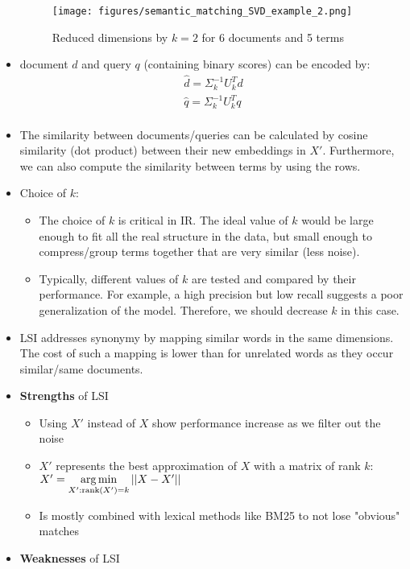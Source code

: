 \begin{itemize}
	\begin{figure}[ht]
		\centering
		\texttt{[image: figures/semantic\_matching\_SVD\_example\_2.png]}
		\caption{Reduced dimensions by $k=2$ for 6 documents and 5 terms}
		\label{img:semantic_matching_SVD_example_2}
	\end{figure}
	\item document $d$ and query $q$ (containing binary scores) can be encoded by:
	\begin{align*}
		\hat{d} = \Sigma_k^{-1} U_k^T d \\
		\hat{q} = \Sigma_k^{-1} U_k^T q \\
	\end{align*}
	\item The similarity between documents/queries can be calculated by cosine similarity (dot product) between their new embeddings in $X'$. Furthermore, we can also compute the similarity between terms by using the rows.
	\item Choice of $k$:
	\begin{itemize}
		\item The choice of $k$ is critical in IR. The ideal value of $k$ would be large enough to fit all the real structure in the data, but small enough to compress/group terms together that are very similar (less noise).
		\item Typically, different values of $k$ are tested and compared by their performance. For example, a high precision but low recall suggests a poor generalization of the model. Therefore, we should decrease $k$ in this case.
	\end{itemize}
	\item LSI addresses synonymy by mapping similar words in the same dimensions. The cost of such a mapping is lower than for unrelated words as they occur similar/same documents. 
	\item \textbf{Strengths} of LSI
	\begin{itemize}
		\item Using $X'$ instead of $X$ show performance increase as we filter out the noise
		\item $X'$ represents the best approximation of $X$ with a matrix of rank $k$: $X' = \operatorname*{arg\,min}\limits_{X':\text{rank}(X')=k} ||X-X'||$
		\item Is mostly combined with lexical methods like BM25 to not lose "obvious" matches
	\end{itemize}
	\item \textbf{Weaknesses} of LSI
	\begin{itemize}

\end{itemize}
\end{itemize}
